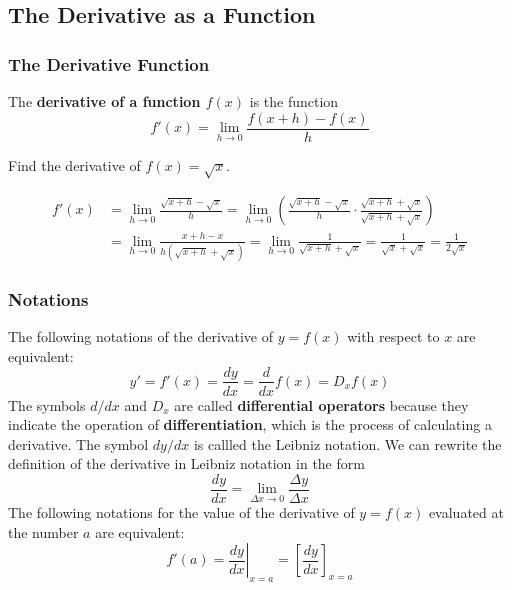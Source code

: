 \subsection{The Derivative as a Function}

\subsubsection*{The Derivative Function}
\begin{definition}
    The \textbf{derivative of a function \(f(x)\)} is the function
    \[f'(x)=\lim_{h\to 0}\frac{f(x+h)-f(x)}{h}\]
\end{definition}
\begin{problem}
    Find the derivative of \(f(x)=\sqrt{x}\).
\end{problem}
\begin{solution}
    \begin{align*}
        f'(x) &= \lim_{h\to 0}\frac{\sqrt{x+h}-\sqrt{x}}{h}=\lim_{h\to 0}
        \left(\frac{\sqrt{x+h}-\sqrt{x}}{h}\cdot
        \frac{\sqrt{x+h}+\sqrt{x}}{\sqrt{x+h}+\sqrt{x}}\right) \\
        &= \lim_{h\to 0}\frac{x+h-x}{h(\sqrt{x+h}+\sqrt{x})}
        =\lim_{h\to 0}\frac{1}{\sqrt{x+h}+\sqrt{x}}
        =\frac{1}{\sqrt{x}+\sqrt{x}}=\frac{1}{2\sqrt{x}} 
    \end{align*}
\end{solution}

\subsubsection*{Notations}
The following notations of the derivative of \(y=f(x)\) with respect to \(x\)
are equivalent:
\[y'=f'(x)=\frac{dy}{dx}=\frac{d}{dx}f(x)=D_x f(x)\]
The symbols \(d/dx\) and \(D_x\) are called \textbf{differential operators}
because they indicate the operation of \textbf{differentiation},
which is the process of calculating a derivative.
The symbol \(dy/dx\) is callled the Leibniz notation.
We can rewrite the definition of the derivative in Leibniz notation in the
form
\[\frac{dy}{dx}=\lim_{\Delta x\to0}\frac{\Delta y}{\Delta x}\]
The following notations for the value of the derivative of \(y=f(x)\)
evaluated at the number \(a\) are equivalent:
\[f'(a)=\left.\frac{dy}{dx}\right|_{x=a}=\left[\frac{dy}{dx}\right]_{x=a}\]


